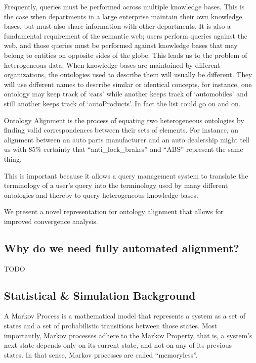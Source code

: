 \documentclass[letterpaper,twocolumn,12pt]{article}
\begin{document}
Frequently, queries must be performed across multiple knowledge bases. This is the
case when departments in a large enterprise maintain their own knowledge bases,
but must also share information with other departments. It is also a fundamental
requirement of the semantic web; users perform queries against the web,
and those queries must be performed against knowledge bases that may belong to 
entities on opposite sides of the globe. This leads us to the problem of heterogeneous
data. When knowledge bases are maintained by different organizations, the ontologies
used to describe them will usually be different. They will use different names
to describe similar or identical concepts, for instance, one ontology may keep track
of `cars' while another keeps track of `automobiles' and still another keeps track of 
`autoProducts'. In fact the list could go on and on.

Ontology Alignment is the process of equating two heterogeneous ontologies by
finding valid correspondences between their sets of elements. 
%
For instance, an alignment between an auto parts manufacturer and an auto dealership
might tell us with 85\% certainty that ``anti\_lock\_brakes'' and ``ABS'' represent
the same thing.

This is important because it allows a query management system to translate the terminology
of a user's query into the terminology used by many different ontologies and thereby
to query heterogeneous knowledge bases.

We present a novel representation for ontology alignment that allows for improved
convergence analysis.

\subsection{Why do we need fully automated alignment?}
\label{subsec:automated}

TODO

\subsection{Statistical \& Simulation Background}
\label{subsec:stat}

A Markov Process is a mathematical model that represents a system as a set of states
and a set of probabilistic transitions between those states. Most importantly, Markov 
processes adhere to the Markov Property, that is, a system's next state depends only
on its current state, and not on any of its previous states. In that sense, Markov
processes are called ``memoryless''.
\end{document}
